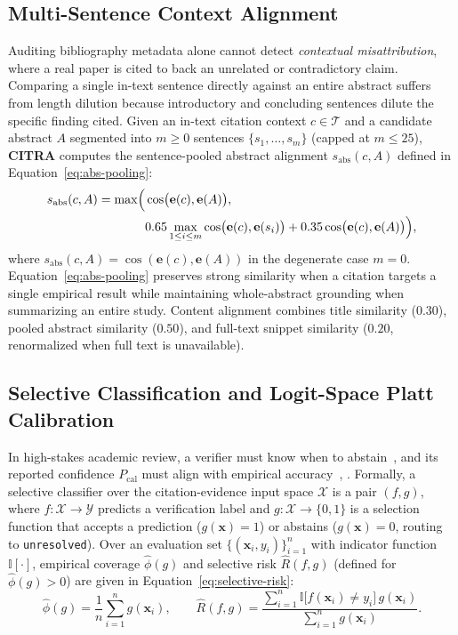 \subsection{Multi-Sentence Context Alignment}

Auditing bibliography metadata alone cannot detect \emph{contextual misattribution}, where a real paper is cited to back an unrelated or contradictory claim. Comparing a single in-text sentence directly against an entire abstract suffers from length dilution because introductory and concluding sentences dilute the specific finding cited. Given an in-text citation context $c \in \mathcal{T}$ and a candidate abstract $A$ segmented into $m \ge 0$ sentences $\{s_1, \dots, s_m\}$ (capped at $m \le 25$), \textbf{CITRA} computes the sentence-pooled abstract alignment $s_{\text{abs}}(c, A)$ defined in Equation~\eqref{eq:abs-pooling}:
\begin{equation}\label{eq:abs-pooling}
\begin{split}
s_{\text{abs}}(c, A) = \max\Bigl(&\cos\bigl(\mathbf{e}(c), \mathbf{e}(A)\bigr),\\
&0.65 \max_{1 \le i \le m} \cos\bigl(\mathbf{e}(c), \mathbf{e}(s_i)\bigr) + 0.35 \cos\bigl(\mathbf{e}(c), \mathbf{e}(A)\bigr)\Bigr),
\end{split}
\end{equation}
where $s_{\text{abs}}(c, A) = \cos(\mathbf{e}(c), \mathbf{e}(A))$ in the degenerate case $m = 0$. Equation~\eqref{eq:abs-pooling} preserves strong similarity when a citation targets a single empirical result while maintaining whole-abstract grounding when summarizing an entire study. Content alignment combines title similarity ($0.30$), pooled abstract similarity ($0.50$), and full-text snippet similarity ($0.20$, renormalized when full text is unavailable).

\subsection{Selective Classification and Logit-Space Platt Calibration}

In high-stakes academic review, a verifier must know when to abstain~\cite{chow1970optimum}, \cite{Geifman2017} and its reported confidence $P_{\text{cal}}$ must align with empirical accuracy~\cite{niculescu2005}, \cite{guo2017}. Formally, a selective classifier over the citation-evidence input space $\mathcal{X}$ is a pair $(f, g)$, where $f: \mathcal{X} \to \mathcal{Y}$ predicts a verification label and $g: \mathcal{X} \to \{0, 1\}$ is a selection function that accepts a prediction ($g(\mathbf{x}) = 1$) or abstains ($g(\mathbf{x}) = 0$, routing to \texttt{unresolved}). Over an evaluation set $\{(\mathbf{x}_i, y_i)\}_{i=1}^{n}$ with indicator function $\mathbb{I}[\cdot]$, empirical coverage $\hat{\phi}(g)$ and selective risk $\hat{R}(f, g)$ (defined for $\hat{\phi}(g) > 0$) are given in Equation~\eqref{eq:selective-risk}:
\begin{equation}\label{eq:selective-risk}
\hat{\phi}(g) = \frac{1}{n}\sum_{i=1}^{n} g(\mathbf{x}_i), \qquad
\hat{R}(f, g) = \frac{\sum_{i=1}^{n} \mathbb{I}\bigl[f(\mathbf{x}_i) \neq y_i\bigr]\, g(\mathbf{x}_i)}{\sum_{i=1}^{n} g(\mathbf{x}_i)}.
\end{equation}


